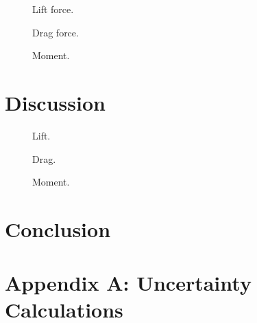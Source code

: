 \documentclass[journal,letterpaper]{IEEEtran}
\begin{document}
\begin{figure}[H]
    \centering
    
    \caption{Lift force.}
    \label{fig:Lift}
\end{figure}

\begin{figure}[H]
    \centering
    
    \caption{Drag force.}
    \label{fig:Drag}
\end{figure}

\begin{figure}[H]
    \centering
    
    \caption{Moment.}
    \label{fig:Moment}
\end{figure}


\section{Discussion}


\begin{figure}[H]
    \centering
    
    \caption{Lift.}
    \label{fig:complift}
\end{figure}

\begin{figure}[H]
    \centering
    
    \caption{Drag.}
    \label{fig:compdrag}
\end{figure}

\begin{figure}[H]
    \centering
    
    \caption{Moment.}
    \label{fig:compmoment}
\end{figure}


\section{Conclusion}





\section*{Appendix A: Uncertainty Calculations}
\end{document}

